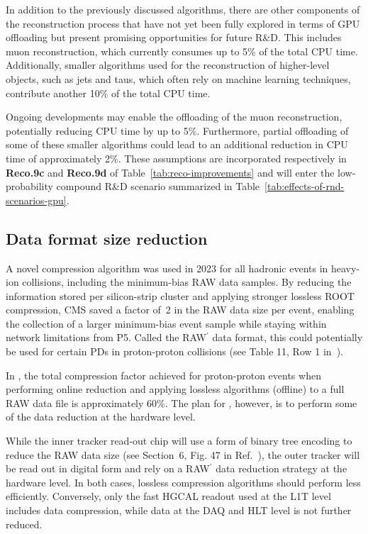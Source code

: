 In addition to the previously discussed algorithms, there are other components of the reconstruction process that have not yet been fully explored in terms of \gls{GPU} offloading but present promising opportunities for future R\&D. This includes muon reconstruction, which currently consumes up to 5\% of the total \gls{CPU} time. Additionally, smaller algorithms used for the reconstruction of higher-level objects, such as jets and taus, which often rely on machine learning techniques, contribute another 10\% of the total \gls{CPU} time. 

Ongoing developments may enable the offloading of the muon reconstruction, potentially reducing \gls{CPU} time by up to 5\%. Furthermore, partial offloading of some of these smaller algorithms could lead to an additional reduction in \gls{CPU} time of approximately 2\%. These assumptions are incorporated respectively in \textbf{Reco.9c} and \textbf{Reco.9d} of Table~\ref{tab:reco-improvements} and will enter the low-probability compound R\&D scenario summarized in Table~\ref{tab:effects-of-rnd-scenarios-gpu}.

\subsection{Data format size reduction}
\label{sec:rawprime}

A novel compression algorithm was used in 2023 for all hadronic events in heavy-ion collisions, including the minimum-bias \gls{RAW} data samples. By reducing the information stored per silicon-strip cluster and applying stronger lossless \textsc{ROOT} compression, CMS saved a factor of~2 in the \gls{RAW} data size per event, enabling the collection of a larger minimum-bias event sample while staying within network limitations from P5. Called the \gls{RAW}$^\prime$ data format, this could potentially be used for certain PDs in proton-proton collisions (see Table 11, Row 1 in~\cite{Software:2815292}).

In \RunThree, the total compression factor achieved for proton-proton events when performing online reduction and applying lossless algorithms (offline) to a full \gls{RAW} data file is approximately 60\%. The plan for \PhaseTwo, however, is to perform some of the data reduction at the hardware level. 

While the inner tracker read-out chip will use a form of binary tree encoding to reduce the \gls{RAW} data size (see Section~6, Fig. 47 in Ref.~\cite{ITcomp}), the outer tracker will be read out in digital form and rely on a \gls{RAW}$^\prime$ data reduction strategy at the hardware level. In both cases, lossless compression algorithms should perform less efficiently. Conversely, only the fast \gls{HGCAL} readout used at the \gls{L1T} level includes data compression, while data at the \gls{DAQ} and \gls{HLT} level is not further reduced.

